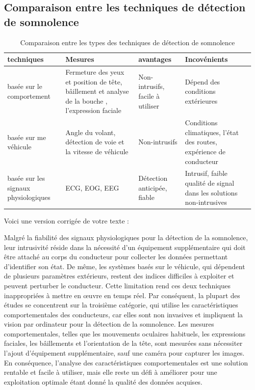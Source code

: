 \subsection{ Comparaison entre les techniques de détection de somnolence }
\begin{table}[htbp]
    \centering
    \begin{tabularx}{\textwidth}{|X|X|X|X|}
    \hline
        techniques  & Mesures & avantages & Incovénients \\
        \hline
      basée sur le comportement& Fermeture des yeux et position de tête, bâillement et analyse de la bouche , l’expression faciale  &  Non-intrusifs, facile à utiliser & Dépend des conditions extérieures\\ 
      \hline
      basée sur me véhicule & Angle du volant, détection de voie et la vitesse de véhicule & Non-intrusifs & Conditions climatiques, l’état des routes, expérience de conducteur\\
      \hline
      basée sur les signaux physiologiques &  ECG, EOG, EEG & Détection anticipée, fiable & Intrusif, faible qualité de signal dans les solutions non-intrusives \\
\hline
    \end{tabularx}
    \caption{Comparaison entre les types des techniques de détection de somnolence}
    \label{tab:my_label}
\end{table}


Voici une version corrigée de votre texte :

Malgré la fiabilité des signaux physiologiques pour la détection de la somnolence, leur intrusivité réside dans la nécessité d'un équipement supplémentaire qui doit être attaché au corps du conducteur pour collecter les données permettant d'identifier son état. De même, les systèmes basés sur le véhicule, qui dépendent de plusieurs paramètres extérieurs, restent des indices difficiles à exploiter et peuvent perturber le conducteur. Cette limitation rend ces deux techniques inappropriées à mettre en œuvre en temps réel. Par conséquent, la plupart des études se concentrent sur la troisième catégorie, qui utilise les caractéristiques comportementales des conducteurs, car elles sont non invasives et impliquent la vision par ordinateur pour la détection de la somnolence. Les mesures comportementales, telles que les mouvements oculaires habituels, les expressions faciales, les bâillements et l'orientation de la tête, sont mesurées sans nécessiter l'ajout d'équipement supplémentaire, sauf une caméra pour capturer les images. En conséquence, l'analyse des caractéristiques comportementales est une solution rentable et facile à utiliser, mais elle reste un défi à améliorer pour une exploitation optimale étant donné la qualité des données acquises.

